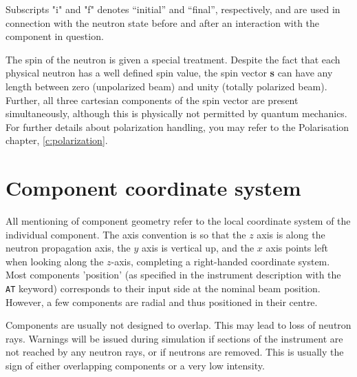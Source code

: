Subscripts "i" and "f" denotes ``initial'' and ``final'', respectively,
and are used in connection with the neutron state before and after
an interaction with the component in question.

The spin of the neutron is given a special treatment. Despite
the fact that each physical neutron has a well defined spin value,
the \MCS spin vector
\textbf{s} can have any length between zero (unpolarized beam) and unity
(totally polarized beam). Further, all three cartesian components of
the spin vector are present simultaneously, although this is physically
not permitted by quantum mechanics.
For further details about polarization handling, you may refer to the Polarisation chapter, \ref{c:polarization}.

\section{Component coordinate system}
All mentioning of component geometry refer to
the local coordinate system of the individual component.
The axis convention is so that the $z$ axis is along
the neutron propagation axis, the $y$ axis is vertical up,
and the $x$ axis points left when looking along the $z$-axis,
completing a right-handed coordinate system.
Most components 'position' (as specified in the instrument description
with the \verb+AT+ keyword) corresponds to their input side at the nominal
beam position.
However, a few components are radial and thus positioned in their centre.

Components are usually not designed to overlap.
This may lead to loss of neutron rays.
Warnings will be issued during simulation if sections of the instrument
are not reached by any neutron rays, or if neutrons are removed.
This is usually the sign of either overlapping components
or a very low intensity.

